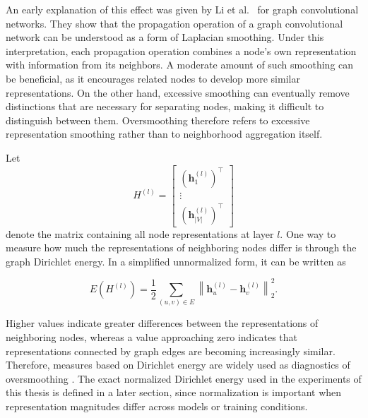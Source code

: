 \documentclass[english]{lni}
\begin{document}
An early explanation of this effect was given by Li et al.\ \cite{li2018oversmoothing} for graph convolutional networks. They show that the propagation operation of a graph convolutional network can be understood as a form of Laplacian smoothing. Under this interpretation, each propagation operation combines a node's own representation with information from its neighbors. A moderate amount of such smoothing can be beneficial, as it encourages related nodes to develop more similar representations. On the other hand, excessive smoothing can eventually remove distinctions that are necessary for separating nodes, making it difficult to distinguish between them. Oversmoothing therefore refers to excessive representation smoothing rather than to neighborhood aggregation itself.

Let
\[
    H^{(l)}
    =
    \begin{bmatrix}
        (\mathbf{h}_1^{(l)})^\top \\
        \vdots \\
        (\mathbf{h}_{|V|}^{(l)})^\top
    \end{bmatrix}
\]
denote the matrix containing all node representations at layer $l$. One way to measure how much the representations of neighboring nodes differ is through the graph Dirichlet energy. In a simplified unnormalized form, it can be written as

\begin{equation}
    E\!\left(H^{(l)}\right)
    =
    \frac{1}{2}
    \sum_{(u,v)\in E}
    \left\|
        \mathbf{h}_u^{(l)}
        -
        \mathbf{h}_v^{(l)}
    \right\|_2^2 .
    \label{eq:dirichlet-energy}
\end{equation}

Higher values indicate greater differences between the representations of neighboring nodes, whereas a value approaching zero indicates that representations connected by graph edges are becoming increasingly similar. Therefore, measures based on Dirichlet energy are widely used as diagnostics of oversmoothing \cite{rusch2023oversmoothing}. The exact normalized Dirichlet energy used in the experiments of this thesis is defined in a later section, since normalization is important when representation magnitudes differ across models or training conditions. 
\end{document}
